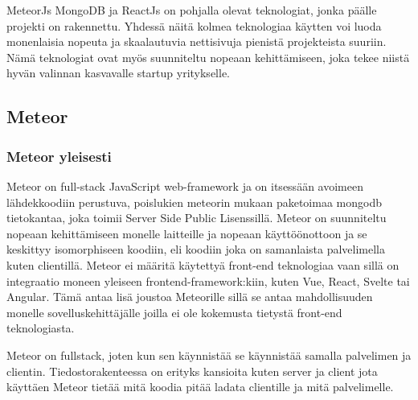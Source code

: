 \documentclass[11pt,a4paper,titlepage,oneside]{article}
\begin{document}
MeteorJs MongoDB ja ReactJs on pohjalla olevat teknologiat, jonka päälle projekti on rakennettu.
Yhdessä näitä kolmea teknologiaa käytten voi luoda monenlaisia nopeuta ja skaalautuvia nettisivuja pienistä projekteista suuriin.
Nämä teknologiat ovat myös suunniteltu nopeaan kehittämiseen, joka tekee niistä hyvän valinnan kasvavalle startup yritykselle.
\medskip









\newpage
\subsection{Meteor}                %



\subsubsection{Meteor yleisesti}








Meteor on full-stack JavaScript web-framework ja on itsessään avoimeen lähdekkoodiin perustuva, 
poislukien meteorin mukaan paketoimaa mongodb tietokantaa, joka toimii Server Side Public Lisenssillä.
Meteor on suunniteltu nopeaan kehittämiseen monelle laitteille ja nopeaan käyttöönottoon ja se keskittyy isomorphiseen koodiin, 
eli koodiin joka on samanlaista palvelimella kuten clientillä.\citemissing
Meteor ei määritä käytettyä front-end teknologiaa vaan sillä on integraatio moneen yleiseen frontend-framework:kiin, kuten Vue, React, Svelte tai Angular.
Tämä antaa lisä joustoa Meteorille sillä se antaa mahdollisuuden monelle sovelluskehittäjälle joilla ei ole kokemusta tietystä front-end teknologiasta.



\medskip

Meteor on fullstack, joten kun sen käynnistää se käynnistää samalla palvelimen ja clientin.
Tiedostorakenteessa on erityks kansioita kuten server ja client jota käyttäen Meteor tietää mitä koodia pitää ladata clientille ja mitä palvelimelle.
\end{document}

